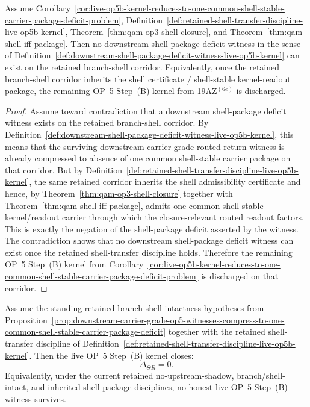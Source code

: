 \begin{proposition}
\label{prop:inherited-shell-closure-package-excludes-downstream-shell-package-deficit-witnesses}
Assume Corollary~\ref{cor:live-op5b-kernel-reduces-to-one-common-shell-stable-carrier-package-deficit-problem}, Definition~\ref{def:retained-shell-transfer-discipline-live-op5b-kernel}, Theorem~\ref{thm:qam-op3-shell-closure}, and Theorem~\ref{thm:qam-shell-iff-package}. Then no downstream shell-package deficit witness in the sense of Definition~\ref{def:downstream-shell-package-deficit-witness-live-op5b-kernel} can exist on the retained branch-shell corridor. Equivalently, once the retained branch-shell corridor inherits the shell certificate / shell-stable kernel-readout package, the remaining OP~5 Step~(B) kernel from 19AZ$^{(6e)}$ is discharged.
\end{proposition}

\begin{proof}
Assume toward contradiction that a downstream shell-package deficit witness exists on the retained branch-shell corridor. By Definition~\ref{def:downstream-shell-package-deficit-witness-live-op5b-kernel}, this means that the surviving downstream carrier-grade routed-return witness is already compressed to absence of one common shell-stable carrier package on that corridor. But by Definition~\ref{def:retained-shell-transfer-discipline-live-op5b-kernel}, the same retained corridor inherits the shell admissibility certificate and hence, by Theorem~\ref{thm:qam-op3-shell-closure} together with Theorem~\ref{thm:qam-shell-iff-package}, admits one common shell-stable kernel/readout carrier through which the closure-relevant routed readout factors. This is exactly the negation of the shell-package deficit asserted by the witness. The contradiction shows that no downstream shell-package deficit witness can exist once the retained shell-transfer discipline holds. Therefore the remaining OP~5 Step~(B) kernel from Corollary~\ref{cor:live-op5b-kernel-reduces-to-one-common-shell-stable-carrier-package-deficit-problem} is discharged on that corridor.
\end{proof}

\begin{corollary}
\label{cor:closure-live-op5b-kernel-under-standing-retained-branch-shell-and-shell-transfer-disciplines}
Assume the standing retained branch-shell intactness hypotheses from Proposition~\ref{prop:downstream-carrier-grade-op5-witnesses-compress-to-one-common-shell-stable-carrier-package-deficit} together with the retained shell-transfer discipline of Definition~\ref{def:retained-shell-transfer-discipline-live-op5b-kernel}. Then the live OP~5 Step~(B) kernel closes:
\[
\Delta_{\Theta R}=0.
\]
Equivalently, under the current retained no-upstream-shadow, branch/shell-intact, and inherited shell-package disciplines, no honest live OP~5 Step~(B) witness survives.
\end{corollary}

